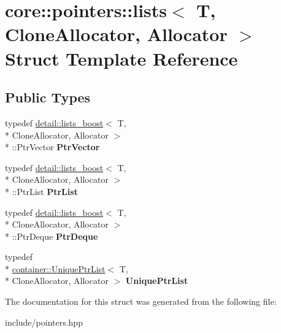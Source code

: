 \hypertarget{structcore_1_1pointers_1_1lists}{\section{core\-:\-:pointers\-:\-:lists$<$ T, Clone\-Allocator, Allocator $>$ Struct Template Reference}
\label{structcore_1_1pointers_1_1lists}
}
\subsection*{Public Types}
\begin{DoxyCompactItemize}
\item 
\hypertarget{structcore_1_1pointers_1_1lists_ad487a9419bfb9a275411d7239b301b72}{typedef \hyperlink{structcore_1_1pointers_1_1detail_1_1lists__boost}{detail\-::lists\-\_\-boost}$<$ T, \\*
Clone\-Allocator, Allocator $>$\\*
\-::Ptr\-Vector {\bfseries Ptr\-Vector}}\label{structcore_1_1pointers_1_1lists_ad487a9419bfb9a275411d7239b301b72}

\item 
\hypertarget{structcore_1_1pointers_1_1lists_a28a3e0bb47831a8c178f871d907b212d}{typedef \hyperlink{structcore_1_1pointers_1_1detail_1_1lists__boost}{detail\-::lists\-\_\-boost}$<$ T, \\*
Clone\-Allocator, Allocator $>$\\*
\-::Ptr\-List {\bfseries Ptr\-List}}\label{structcore_1_1pointers_1_1lists_a28a3e0bb47831a8c178f871d907b212d}

\item 
\hypertarget{structcore_1_1pointers_1_1lists_a3ff4ff5b5438e164e28caba8b0146151}{typedef \hyperlink{structcore_1_1pointers_1_1detail_1_1lists__boost}{detail\-::lists\-\_\-boost}$<$ T, \\*
Clone\-Allocator, Allocator $>$\\*
\-::Ptr\-Deque {\bfseries Ptr\-Deque}}\label{structcore_1_1pointers_1_1lists_a3ff4ff5b5438e164e28caba8b0146151}

\item 
\hypertarget{structcore_1_1pointers_1_1lists_af71e462267103c036bcc2230d5589ba0}{typedef \\*
\hyperlink{classcore_1_1container_1_1_unique_ptr_list}{container\-::\-Unique\-Ptr\-List}$<$ T, \\*
Clone\-Allocator, Allocator $>$ {\bfseries Unique\-Ptr\-List}}\label{structcore_1_1pointers_1_1lists_af71e462267103c036bcc2230d5589ba0}

\end{DoxyCompactItemize}


The documentation for this struct was generated from the following file\-:\begin{DoxyCompactItemize}
\item 
include/pointers.\-hpp\end{DoxyCompactItemize}
